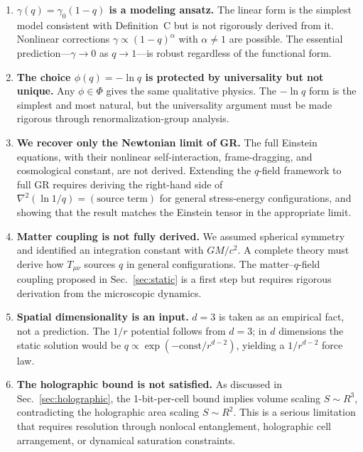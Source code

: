 \documentclass[aps,prd,twocolumn,showpacs,superscriptaddress,preprintnumbers]{revtex4-2}
\begin{document}
\begin{enumerate}
    \item \textbf{$\gamma(q)=\gamma_0(1-q)$ is a modeling ansatz.} The linear form is the simplest model consistent with Definition~C but is not rigorously derived from it. Nonlinear corrections $\gamma\propto(1-q)^\alpha$ with $\alpha\neq1$ are possible. The essential prediction---$\gamma\to0$ as $q\to1$---is robust regardless of the functional form.

    \item \textbf{The choice $\phi(q)=-\ln q$ is protected by universality but not unique.} Any $\phi\in\Phi$ gives the same qualitative physics. The $-\ln q$ form is the simplest and most natural, but the universality argument must be made rigorous through renormalization-group analysis.

    \item \textbf{We recover only the Newtonian limit of GR.} The full Einstein equations, with their nonlinear self-interaction, frame-dragging, and cosmological constant, are not derived. Extending the $q$-field framework to full GR requires deriving the right-hand side of $\nabla^2(\ln 1/q)=(\text{source term})$ for general stress-energy configurations, and showing that the result matches the Einstein tensor in the appropriate limit.

    \item \textbf{Matter coupling is not fully derived.} We assumed spherical symmetry and identified an integration constant with $GM/c^2$. A complete theory must derive how $T_{\mu\nu}$ sources $q$ in general configurations. The matter--$q$-field coupling proposed in Sec.~\ref{sec:static} is a first step but requires rigorous derivation from the microscopic dynamics.

    \item \textbf{Spatial dimensionality is an input.} $d=3$ is taken as an empirical fact, not a prediction. The $1/r$ potential follows from $d=3$; in $d$ dimensions the static solution would be $q\propto\exp(-\text{const}/r^{d-2})$, yielding a $1/r^{d-2}$ force law.

    \item \textbf{The holographic bound is not satisfied.} As discussed in Sec.~\ref{sec:holographic}, the 1-bit-per-cell bound implies volume scaling $S\sim R^3$, contradicting the holographic area scaling $S\sim R^2$. This is a serious limitation that requires resolution through nonlocal entanglement, holographic cell arrangement, or dynamical saturation constraints.


\end{enumerate}
\end{document}
